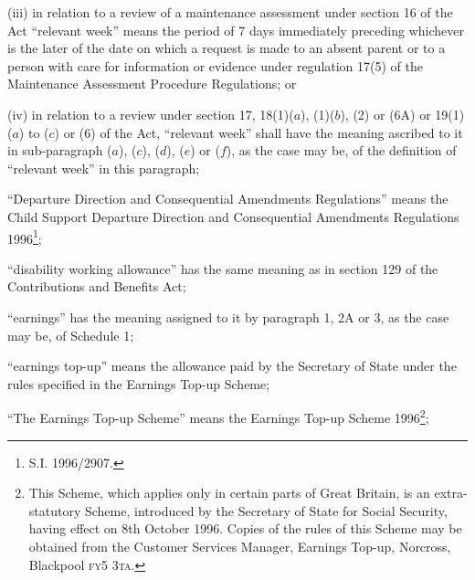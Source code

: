 \documentclass[12pt,a4paper]{article}
\begin{document}
\begin{enumerate}
\begin{enumerate}
(iii) in relation to a review of a maintenance assessment under section 16 of the Act “relevant week” means the period of 7 days immediately preceding whichever is the later of the date on which a request is made to an absent parent or to a person with care for information or evidence under regulation 17(5) of the Maintenance Assessment Procedure Regulations; or

(iv) in relation to a review under section 17, 18(1)($a$), (1)($b$), (2) or (6A) or 19(1)($a$) to ($c$) or (6) of the Act, “relevant week” shall have the meaning ascribed to it in sub-paragraph ($a$), ($c$), ($d$), ($e$) or ($f$), as the case may be, of the definition of “relevant week” in this paragraph;
\end{enumerate}


“Departure Direction and Consequential Amendments Regulations” means the Child Support Departure Direction and Consequential Amendments Regulations 1996\footnote{\frenchspacing S.I. 1996/2907.};

“disability working allowance” has the same meaning as in section 129 of the Contributions and Benefits Act;

“earnings” has the meaning assigned to it by paragraph 
1, 2A or 3,  %
as the case may be, of Schedule 1;

“earnings top-up” means the allowance paid by the Secretary of State under the rules specified in the Earnings Top-up Scheme;

“The Earnings Top-up Scheme” means the Earnings Top-up Scheme 1996\footnote{\frenchspacing This Scheme, which applies only in certain parts of Great Britain, is an extra-statutory Scheme, introduced by the Secretary of State for Social Security, having effect on 8th October 1996. Copies of the rules of this Scheme may be obtained from the Customer Services Manager, Earnings Top-up, Norcross, Blackpool \textsc{fy5 3ta}.};


\end{enumerate}
\end{document}

